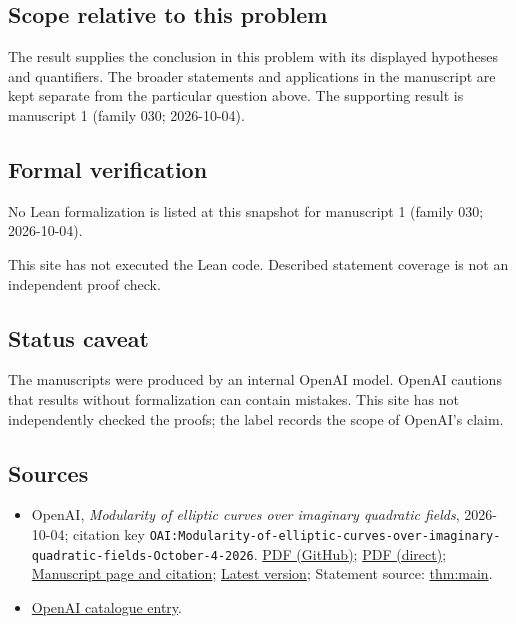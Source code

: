\documentclass[11pt]{article}
\begin{document}
\subsection{Scope relative to this problem}
The result supplies the conclusion in this problem with its displayed hypotheses and quantifiers. The broader statements and applications in the manuscript are kept separate from the particular question above. The supporting result is manuscript 1 (family 030; 2026-10-04).

\subsection{Formal verification}
No Lean formalization is listed at this snapshot for manuscript 1 (family 030; 2026-10-04).

This site has not executed the Lean code. Described statement coverage is not an independent proof check.

\subsection{Status caveat}
The manuscripts were produced by an internal OpenAI model. OpenAI cautions that results without formalization can contain mistakes. This site has not independently checked the proofs; the label records the scope of OpenAI's claim.

\subsection{Sources}
\begin{itemize}
\item OpenAI, \emph{Modularity of elliptic curves over imaginary quadratic fields}, 2026-10-04; citation key \texttt{OAI:Modularity-of-elliptic-curves-over-imaginary-quadratic-fields-October-4-2026}. \href{https://github.com/openai/math/blob/adc7f1241b42e322a6451854ab7e4b4c146bf78a/preprints/Modularity-of-elliptic-curves-over-imaginary-quadratic-fields-October-4-2026/paper.pdf}{PDF (GitHub)}; \href{https://github.com/openai/math/raw/adc7f1241b42e322a6451854ab7e4b4c146bf78a/preprints/Modularity-of-elliptic-curves-over-imaginary-quadratic-fields-October-4-2026/paper.pdf}{PDF (direct)}; \href{https://github.com/openai/math/blob/adc7f1241b42e322a6451854ab7e4b4c146bf78a/preprints/Modularity-of-elliptic-curves-over-imaginary-quadratic-fields-October-4-2026/README.md}{Manuscript page and citation}; \href{https://github.com/openai/math/blob/main/preprints/Modularity-of-elliptic-curves-over-imaginary-quadratic-fields-October-4-2026/paper.pdf}{Latest version}; Statement source: \href{https://github.com/openai/math/blob/adc7f1241b42e322a6451854ab7e4b4c146bf78a/preprints/Modularity-of-elliptic-curves-over-imaginary-quadratic-fields-October-4-2026/build/sections/introduction.tex\#L17}{thm:main}.
\item \href{https://github.com/openai/math/blob/adc7f1241b42e322a6451854ab7e4b4c146bf78a/CONTENTS.md}{OpenAI catalogue entry}.
\end{itemize}
\end{document}
